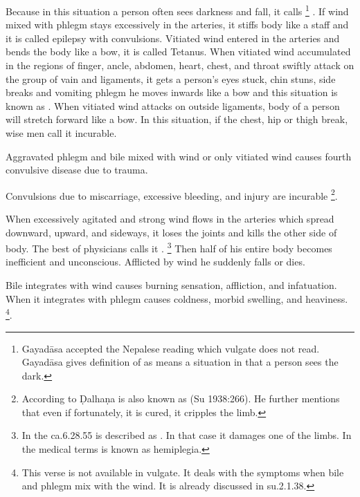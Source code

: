 \begin{translation}
	Because in this situation a person often sees darkness and fall, it
	calls  \footnote{Gayadāsa accepted
	the Nepalese reading  which vulgate does not read.  Gayadāsa
	gives definition of  as  means a situation in
	that a person sees the dark.} . If wind mixed with phlegm stays
	excessively in the arteries, it stiffs body like a staff and it is
	called  epilepsy with convulsions. Vitiated wind entered
	in the arteries and bends the body like a bow, it is called
	 Tetanus. When vitiated wind accumulated in the regions of
	finger, ancle, abdomen, heart, chest, and throat swiftly attack on the
	group of vain and ligaments, it gets a person’s eyes stuck, chin stuns,
	side breaks and vomiting phlegm he moves inwards like a bow and this
	situation is known as . When vitiated
	wind attacks on outside ligaments, body of a person will stretch forward
	like a bow. In this situation, if the chest, hip or thigh break, wise
	men call it incurable.

\item[58]

	Aggravated phlegm and bile mixed with wind or only vitiated wind causes
	fourth convulsive disease due to trauma.

\item[59]

	Convulsions due to miscarriage, excessive bleeding, and injury are
	incurable \footnote{According to Ḍalhaṇa  is
	also known as  (Su 1938:266). He further mentions that even
	if fortunately, it is cured, it cripples the limb.}.

\item[60--62]

	When excessively agitated and strong wind flows in the arteries which
	spread downward, upward, and sideways, it loses the joints and kills the
	other side of body. The best of physicians calls it
	.  \footnote{In the ca.6.28.55 
	is described as . In that case it damages one
	of the limbs.  In the medical terms  is known
	as hemiplegia.} Then half of his entire body becomes inefficient and
	unconscious. Afflicted by wind he suddenly falls or dies.

\item[62.1]

	Bile integrates with wind causes burning sensation, affliction, and
	infatuation. When it integrates with phlegm causes coldness, morbid
	swelling, and heaviness. \footnote{This verse is not available in
	vulgate. It deals with the symptoms when bile and phlegm mix with the
	wind. It is already discussed in su.2.1.38.}. 


\end{translation}
